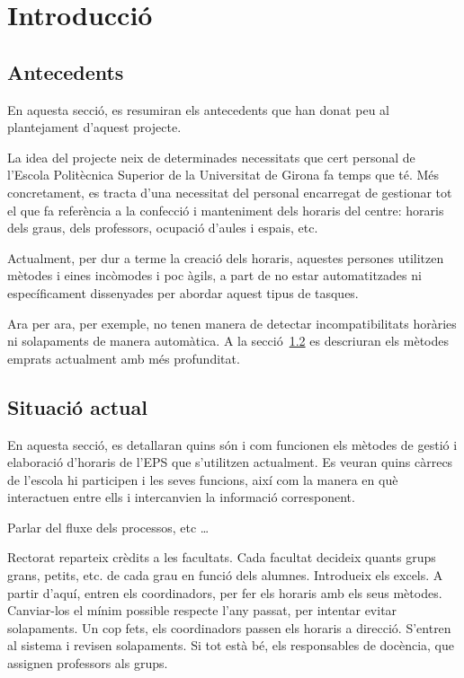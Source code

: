 \documentclass[a4paper,12pt]{ThesisStyle}
\begin{document}


\mainmatter

\chapter{Introducció}
\label{cap:intro}

\section{Antecedents}
\label{sec:antecedents}

En aquesta secció, es resumiran els antecedents que han donat peu al plantejament d'aquest projecte.

La idea del projecte neix de determinades necessitats que cert personal de l'Escola Politècnica Superior de la Universitat de Girona fa temps que té. Més concretament, es tracta d'una necessitat del personal encarregat de gestionar tot el que fa referència a la confecció i manteniment dels horaris del centre: horaris dels graus, dels professors, ocupació d'aules i espais, etc.

Actualment, per dur a terme la creació dels horaris, aquestes persones utilitzen mètodes i eines incòmodes i poc àgils, a part de no estar automatitzades ni específicament dissenyades per abordar aquest tipus de tasques.

Ara per ara, per exemple, no tenen manera de detectar incompatibilitats horàries ni solapaments de manera automàtica. A la secció~\ref{sec:situacio_actual} es descriuran els mètodes emprats actualment amb més profunditat.

\section{Situació actual}
\label{sec:situacio_actual}

En aquesta secció, es detallaran quins són i com funcionen els mètodes de gestió i elaboració d'horaris de l'EPS que s'utilitzen actualment. Es veuran quins càrrecs de l'escola hi participen i les seves funcions, així com la manera en què interactuen entre ells i intercanvien la informació corresponent.

Parlar del fluxe dels processos, etc \ldots

Rectorat reparteix crèdits a les facultats. Cada facultat decideix quants grups grans, petits, etc. de cada grau en funció dels alumnes. Introdueix els excels.
A partir d'aquí, entren els coordinadors, per fer els horaris amb els seus mètodes. Canviar-los el mínim possible respecte l'any passat, per intentar evitar
solapaments. Un cop fets, els coordinadors passen els horaris a direcció. S'entren al sistema i revisen solapaments. Si tot està bé, els responsables de docència,
que assignen professors als grups. 
\end{document}
